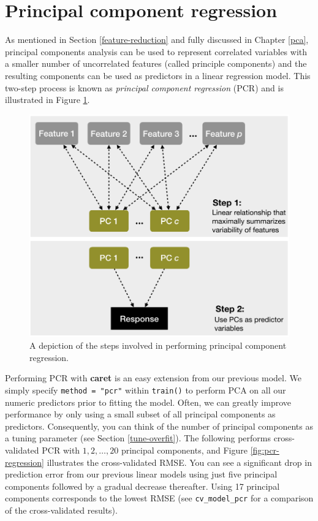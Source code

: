 \documentclass[]{krantz}
\begin{document}
\hypertarget{PCR}{%
\section{Principal component regression}\label{PCR}}

As mentioned in Section \ref{feature-reduction} and fully discussed in Chapter \ref{pca}, principal components analysis can be used to represent correlated variables with a smaller number of uncorrelated features (called principle components) and the resulting components can be used as predictors in a linear regression model. This two-step process is known as \emph{principal component regression} (PCR) \citep{massy1965principal} and is illustrated in Figure \ref{fig:pcr-steps}.

\begin{figure}

{\centering \includegraphics[width=0.7\linewidth,height=0.7\textheight]{images/pcr-steps} 

}

\caption{A depiction of the steps involved in performing principal component regression.}\label{fig:pcr-steps}
\end{figure}

Performing PCR with \textbf{caret} is an easy extension from our previous model. We simply specify \texttt{method\ =\ "pcr"} within \texttt{train()} to perform PCA on all our numeric predictors prior to fitting the model. Often, we can greatly improve performance by only using a small subset of all principal components as predictors. Consequently, you can think of the number of principal components as a tuning parameter (see Section \ref{tune-overfit}). The following performs cross-validated PCR with \(1, 2, \dots, 20\) principal components, and Figure \ref{fig:pcr-regression} illustrates the cross-validated RMSE. You can see a significant drop in prediction error from our previous linear models using just five principal components followed by a gradual decrease thereafter. Using 17 principal components corresponds to the lowest RMSE (see \texttt{cv\_model\_pcr} for a comparison of the cross-validated results).
\end{document}
